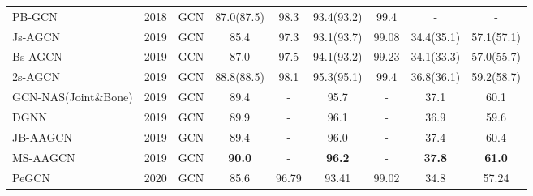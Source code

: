 \documentclass[runningheads]{llncs}
\begin{document}
\begin{table*}[h]
{\begin{tabular}{l c c c c c c c c}
        \multicolumn{1}{l}{PB-GCN \cite{thakkar2018part}} & 2018 & GCN  &  87.0(87.5) & 98.3 & 93.4(93.2) & 99.4 & - & -\\
        \multicolumn{1}{l}{Js-AGCN \cite{shi2019two}}& 2019 &GCN   & 85.4 & 97.3  & 93.1(93.7)   & 99.08  & 34.4(35.1) & 57.1(57.1) \\
		\multicolumn{1}{l}{Bs-AGCN \cite{shi2019two}}& 2019  &GCN   & 87.0 & 97.5  & 94.1(93.2) &  99.23   & 34.1(33.3) &57.0(55.7)  \\
		\multicolumn{1}{l}{2s-AGCN \cite{shi2019two}}& 2019 &GCN   & 88.8(88.5) & 98.1  & 95.3(95.1)  & 99.4 & 36.8(36.1) & 59.2(58.7)  \\
		\multicolumn{1}{l}{GCN-NAS(Joint\&Bone) \cite{peng2019learning}}& 2019 &GCN & 89.4 &- &95.7 &- &37.1& 60.1  \\
     	\multicolumn{1}{l}{DGNN \cite{shi2019skeleton}}& 2019 & GCN & 89.9  &- & 96.1 &- & 36.9 & 59.6 \\
		\multicolumn{1}{l}{JB-AAGCN \cite{shi2019multi}}& 2019 &GCN & 89.4 & - & 96.0 &- & 37.4 & 60.4  \\
		\multicolumn{1}{l}{MS-AAGCN \cite{shi2019multi}}& 2019 &GCN & \textbf{90.0} & - & \textbf{96.2} &- & \textbf{37.8} & \textbf{61.0}  \\
	    \midrule
		\multicolumn{1}{l}{PeGCN}& 2020 & GCN & 85.6 &	96.79&  93.41&	99.02&  34.8&	57.24 \\
		\midrule
		\bottomrule
	\end{tabular}
}
	\label{tab:normal:apx}
	\vspace{-4ex}
\end{table*}
\end{document}
